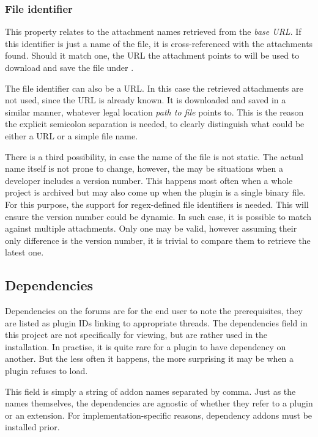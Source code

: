 \subsubsection{File identifier}
\label{file-identifiers}

This property relates to the attachment names retrieved from the \textit{base URL}.
If this identifier is just a name of the file, it is cross-referenced with the attachments found.
Should it match one, the URL the attachment points to will be used to download and save the file under .

The file identifier can also be a URL\@.
In this case the retrieved attachments are not used, since the URL is already known.
It is downloaded and saved in a similar manner, whatever legal location \textit{path to file} points to.
This is the reason the explicit semicolon separation is needed, to clearly distinguish what could be either a URL or a simple file name.

There is a third possibility, in case the name of the file is not static.
The actual name itself is not prone to change, however, the may be situations when a developer includes a version number.
This happens most often when a whole project is archived but may also come up when the plugin is a single binary file.
For this purpose, the support for regex-defined file identifiers is needed.
This will ensure the version number could be dynamic.
In such case, it is possible to match against multiple attachments.
Only one may be valid, however assuming their only difference is the version number, it is trivial to compare them to retrieve the latest one.

\subsection{Dependencies}

Dependencies on the forums are for the end user to note the prerequisites, they are listed as plugin IDs linking to appropriate threads.
The dependencies field in this project are not specifically for viewing, but are rather used in the installation.
In practise, it is quite rare for a plugin to have dependency on another.
But the less often it happens, the more surprising it may be when a plugin refuses to load.

This field is simply a string of addon names separated by comma.
Just as the names themselves, the dependencies are agnostic of whether they refer to a plugin or an extension.
For implementation-specific reasons, dependency addons must be installed prior.

